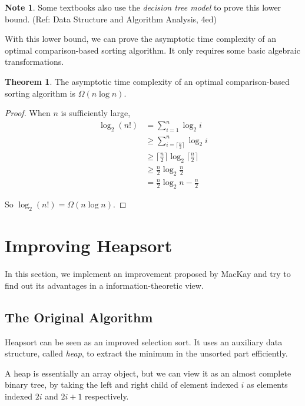 \documentclass[12pt]{extarticle}
\newcommand{\<}{\langle}
\renewcommand{\>}{\rangle}
\theoremstyle{definition}
\newtheorem{theorem}{Theorem}
\newtheorem*{note}{Note}
\begin{document}
\begin{note}
	Some textbooks also use the \textit{decision tree model} to prove this lower bound. (Ref: Data Structure and Algorithm Analysis, 4ed)
\end{note}


With this lower bound, we can prove the asymptotic time complexity of an optimal comparison-based sorting algorithm. It only requires some basic algebraic transformations.

\begin{theorem}
	The asymptotic time complexity of an optimal comparison-based sorting algorithm is $\Omega(n \log n)$.
\end{theorem} 
\begin{proof}
	When $n$ is sufficiently large, 
	$$
	\begin{aligned}
	\log_2(n!) &= \sum_{i=1}^{n} \log_2 i \\
	&\ge \sum_{i=\lceil \frac{n}{2}\rceil}^{n} \log_2 i \\
	& \ge \lceil \frac{n}{2}\rceil \log_2 \lceil \frac{n}{2}\rceil \\
	& \ge \frac{n}{2} \log_2 \frac{n}{2} \\
	&= \frac{n}{2} \log_2 n - \frac{n}{2} 
	\end{aligned}
	$$
	
	So $\log_2(n!) = \Omega(n \log n)$.
\end{proof}


\section{Improving Heapsort}

In this section, we implement an improvement proposed by MacKay and try to find out its advantages in a information-theoretic view.

\subsection{The Original Algorithm}

Heapsort can be seen as an improved selection sort. It uses an auxiliary data structure, called \textit{heap}, to extract the minimum in the unsorted part efficiently. 

A heap is essentially an array object, but we can view it as an almost complete binary tree, by taking the left and right child of element indexed $i$ as elements indexed $2i$ and $2i+1$ respectively.
\end{document}
